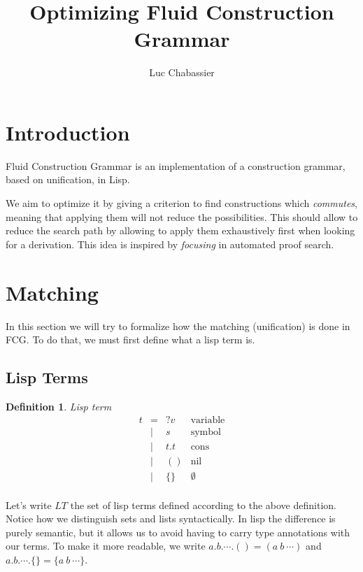 \documentclass[]{article}
\newcommand{\1}{\mathbbm{1}}
\newcommand{\0}{\mathbbm{0}}
\newtheorem{defi}{Definition}
\begin{document}
\title{Optimizing Fluid Construction Grammar}
\author{Luc Chabassier}
\maketitle

\tableofcontents

\section{Introduction}

Fluid Construction Grammar is an implementation of a construction grammar,
based on unification, in Lisp.

We aim to optimize it by giving a criterion to find constructions which
\emph{commutes}, meaning that applying them will not reduce the possibilities.
This should allow to reduce the search path by allowing to apply them
exhaustively first when looking for a derivation. This idea is inspired by
\emph{focusing} in automated proof search.

\section{Matching}

In this section we will try to formalize how the matching (unification) is done
in FCG. To do that, we must first define what a lisp term is.

\subsection{Lisp Terms}

\begin{defi}{Lisp term}
    \[\begin{array}{rcll}
        t & = & ?v    & \text{variable} \\
          & | & s     & \text{symbol}   \\
          & | & t . t & \text{cons}     \\
          & | & ()    & \text{nil}      \\
          & | & \{\}  & \emptyset       \\
    \end{array}\]
\end{defi}

Let's write $LT$ the set of lisp terms defined according to the above
definition. Notice how we distinguish sets and lists syntactically.
In lisp the difference is purely semantic, but it allows us to avoid
having to carry type annotations with our terms. To make it more
readable, we write $a.b.\cdots.() = (a\ b\ \cdots)$ and
$a.b.\cdots.\{\} = \{a\ b\ \cdots\}$.
\end{document}
